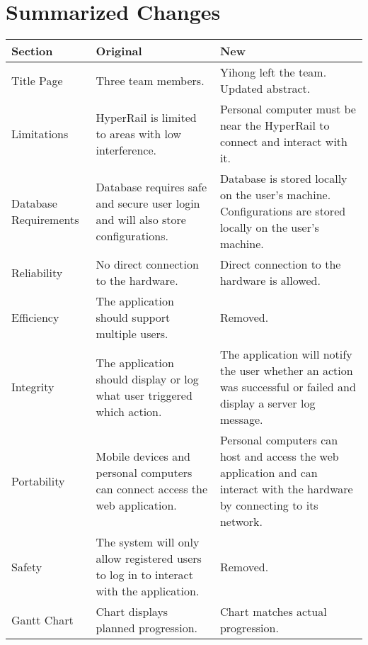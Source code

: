 \documentclass[onecolumn, draftclsnofoot,10pt, compsoc]{IEEEtran}
\begin{document}
\section{Summarized Changes}
\medskip
\begin{centering}

\begin{tabular}{|p{1in} | p{2.5in} | p{2.5in}|}
\hline
\textbf{Section} & \textbf{Original} & \textbf{New}\\\hline
Title Page & Three team members. & Yihong left the team. Updated abstract. \\\hline

Limitations & HyperRail is limited to areas with low interference. & Personal computer must be near the HyperRail to connect and interact with it.\\\hline

Database Requirements & Database requires safe and secure user login and will also store configurations. & Database is stored locally on the user's machine. Configurations are stored locally on the user's machine.\\\hline

Reliability & No direct connection to the hardware. & Direct connection to the hardware is allowed.\\\hline

Efficiency & The application should support multiple users. & Removed. \\\hline

Integrity & The application should display or log what user triggered which action. & The application will notify the user whether an action was successful or failed and display a server log message. \\\hline

Portability & Mobile devices and personal computers can connect access the web application. & Personal computers can host and access the web application and can interact with the hardware by connecting to its network. \\\hline

Safety & The system will only allow registered users to log in to interact with the application. & Removed. \\\hline

Gantt Chart & Chart displays planned progression. & Chart matches actual progression. \\\hline
\end{tabular}

\end{centering}
\end{document}
